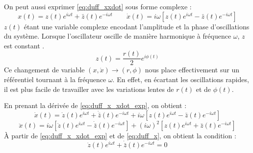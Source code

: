 On peut aussi exprimer \eqref{eq:duff_xxdot} sous forme complexe :
\begin{equation}
    x(t) = z(t)e^{i\omega t} + \bar{z}(t) e^{-i\omega t}
    \qquad 
    \dot{x}(t) = i\omega \left[ z(t)e^{i\omega t} - \bar{z}(t) e^{-i\omega t} \right]
    \label{eq:duff_x_xdot_exp}
\end{equation}
%
$z(t)$ étant une variable complexe encodant l'amplitude et la phase d'oscillations du système. Lorsque l'oscillateur oscille de manière harmonique à fréquence $\omega$, $z$ est constant \cite{pistolesi_duffing_nodate}.
\[ z(t) = \frac{r(t)}{2}e^{i\phi(t)} \]
%
Ce changement de variable $(x, \dot{x}) \to (r, \phi)$ nous place effectivement sur un référentiel tournant à la fréquence $\omega$. 
En effet, en écartant les oscillations rapides, il est plus facile de travailler avec les variations lentes de $r(t)$ et de $\phi(t)$. 

En prenant la dérivée de \eqref{eq:duff_x_xdot_exp}, on obtient :
\begin{equation}
    \dot{x}(t) = \dot{z}(t)e^{i\omega t} + \dot{\bar{z}}(t) e^{-i\omega t} + i\omega \left[ z(t)e^{i\omega t} - \bar{z}(t) e^{-i\omega t} \right]
    \label{eq:duff_x}
\end{equation}
\begin{equation}
    \ddot{x}(t) = i\omega \left[ \dot{z}(t)e^{i\omega t} - \dot{\bar{z}}(t) e^{-i\omega t} \right] + (i\omega)^2 \left[ z(t)e^{i\omega t} + \bar{z}(t) e^{-i\omega t} \right]
\end{equation}
À partir de \eqref{eq:duff_x_xdot_exp} et de \eqref{eq:duff_x}, on obtient la condition :
\begin{equation}
    \dot{z}(t)e^{i\omega t} + \dot{\bar{z}}(t) e^{-i\omega t} = 0
\end{equation}
%
